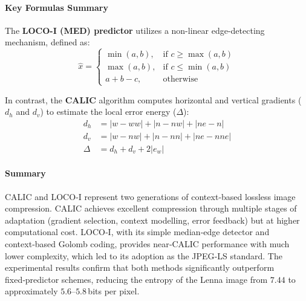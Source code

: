 \paragraph{Key Formulas Summary}





The \textbf{LOCO-I (MED) predictor} utilizes a non-linear edge-detecting mechanism, defined as\cite{Weinberger1996}:
\begin{equation}
    \hat{x} = 
    \begin{cases}
        \min(a,b), & \text{if } c \ge \max(a,b) \\
        \max(a,b), & \text{if } c \le \min(a,b) \\
        a+b-c,     & \text{otherwise}
    \end{cases}
\end{equation}

In contrast, the \textbf{CALIC} algorithm computes horizontal and vertical gradients ($d_h$ and $d_v$) to estimate the local error energy ($\Delta$):
\begin{align}
    d_h &= |w-ww| + |n-nw| + |ne-n| \\[4pt]
    d_v &= |w-nw| + |n-nn| + |ne-nne| \\[4pt]
    \Delta &= d_h + d_v + 2|e_w|
\end{align}





\paragraph{Summary}
CALIC and LOCO‑I represent two generations of context‑based lossless image compression. CALIC achieves excellent compression through multiple stages of adaptation (gradient selection, context modelling, error feedback) but at higher computational cost. LOCO‑I, with its simple median‑edge detector and context‑based Golomb coding, provides near‑CALIC performance with much lower complexity, which led to its adoption as the JPEG‑LS standard. The experimental results confirm that both methods significantly outperform fixed‑predictor schemes, reducing the entropy of the Lenna image from \(7.44\) to approximately \(5.6\)–\(5.8\) bits per pixel.













